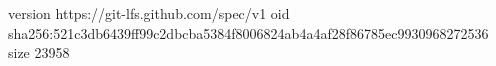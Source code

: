 version https://git-lfs.github.com/spec/v1
oid sha256:521c3db6439ff99c2dbcba5384f8006824ab4a4af28f86785ec9930968272536
size 23958
